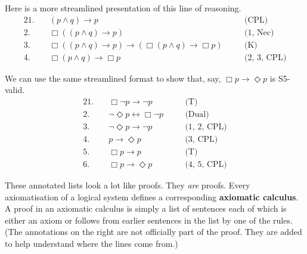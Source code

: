 Here is a more streamlined presentation of this line of reasoning.
%
\begin{alignat*}{2}
  1.\quad& (p \land q) \to p &\quad& \text{(CPL)}\\
  2.\quad& \Box((p \land q) \to p) &\quad& \text{(1, Nec)}\\
  3.\quad& \Box((p \land q) \to p) \to( \Box(p \land q) \to \Box p) &\quad& \text{(K)}\\
  4.\quad& \Box(p \land q) \to \Box p &\quad& \text{(2, 3, CPL)}
\end{alignat*}

We can use the same streamlined format to show that, say,
$\Box p \to \Diamond p$ is S5-valid.
%
\begin{alignat*}{2}
  1.\quad& \Box \neg p \to \neg p &\quad& \text{(T)}\\
  2.\quad& \neg\Diamond p \leftrightarrow \Box \neg p &\quad& \text{(Dual)}\\
  3.\quad& \neg\Diamond p \to \neg p &\quad& \text{(1, 2, CPL)}\\
  4.\quad& p \to \Diamond p &\quad& \text{(3, CPL)}\\
  5.\quad& \Box p \to p &\quad& \text{(T)}\\
  6.\quad& \Box p \to \Diamond p &\quad& \text{(4, 5, CPL)}
\end{alignat*}

These annotated lists look a lot like proofs. They \emph{are} proofs. Every
axiomatisation of a logical system defines a corresponding \textbf{axiomatic
  calculus}. A proof in an axiomatic calculus is simply a list of sentences each
of which is either an axiom or follows from earlier sentences in the list by one
of the rules. (The annotations on the right are not officially part of the proof.
They are added to help understand where the lines come from.)

